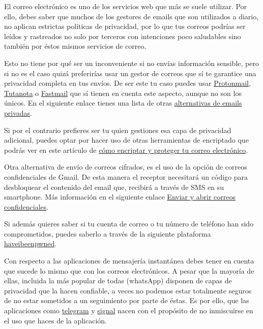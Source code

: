 \documentclass[
  a4paper,
  openany]{book}
\begin{document}
El correo electrónico es uno de los servicios web que más se suele utilizar. Por ello, debes saber que muchos de los gestores de emails que son utilizados a diario, no aplican estrictas políticas de privacidad, por lo que tus correos podrías ser leídos y rastreados no solo por terceros con intenciones poco saludables sino también por éstos mismos servicios de correo.

Esto no tiene por qué ser un inconveniente si no envías información sensible, pero si no es el caso quizá preferirías usar un gestor de correos que sí te garantice una privacidad completa en tus envíos. De ser este tu caso puedes usar \href{https://protonmail.com/}{Protonmail}, \href{https://tutanota.com/es/}{Tutanota} o \href{https://www.fastmail.com}{Fastmail} que sí tienen en cuenta este aspecto, aunque no son los únicos. En el siguiente enlace tienes una lista de otras \href{https://blogthinkbig.com/alternativas-gratuitas-gmail-outlook-privacidad}{alternativas de emails privadas}.

Si por el contrario prefieres ser tu quien gestiones esa capa de privacidad adicional, puedes optar por hacer uso de otras herramientas de encriptado que podrás ver en este artículo de \href{https://www.osi.es/es/actualidad/blog/2019/07/31/como-encriptar-y-proteger-tu-correo-electronico}{cómo encriptar y proteger tu correo electrónico}.

Otra alternativa de envío de correos cifrados, es el uso de la opción de correos confidenciales de Gmail. De esta manera el receptor necesitará un código para desbloquear el contenido del email que, recibirá a través de SMS en su smartphone. Más información en el siguiente enlace \href{https://support.google.com/mail/answer/7674059?hl=es\&co=GENIE.Platform\%3DDesktop}{Enviar y abrir correos confidenciales}.

Si además quieres saber si tu cuenta de correo o tu número de teléfono han sido comprometidos, puedes saberlo a través de la siguiente plataforma \href{https://haveibeenpwned.com/}{haveibeenpwned}.

Con respecto a las aplicaciones de mensajería instantánea debes tener en cuenta que sucede lo mismo que con los correos electrónicos. A pesar que la mayoría de ellas, incluida la más popular de todas (whatsApp) disponen de capas de privacidad que la hacen confiable, a veces no podemos estar totalmente seguros de no estar sometidos a un seguimiento por parte de éstas. Es por ello, que las aplicaciones como \href{https://telegram.org/}{telegram} y \href{https://signal.org/es/}{signal} nacen con el propósito de no inmiscuirse en el uso que haces de la aplicación.
\end{document}
